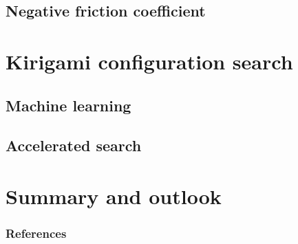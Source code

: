 \documentclass[
	10pt, %
]{beamer}
\begin{document}
\subsection{Negative friction coefficient}


\section{Kirigami configuration search} %
\subsection{Machine learning}
\subsection{Accelerated search}



\section{Summary and outlook} %



\begin{frame}%
	\frametitle{References}
	\printbibliography
\end{frame}
\end{document}
